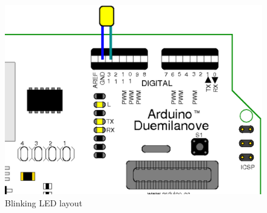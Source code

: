 \begin{figure}[htbp]
  \centering
  \includegraphics[width=0.7\linewidth]{figures/blinkingLED-scaled.eps}
  \caption{Blinking LED layout
  \label{fig:blinkingLEDLayout}}
\end{figure}
